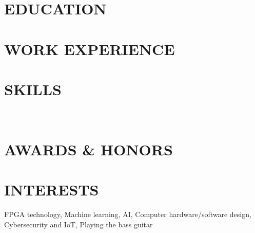 \documentclass[11pt,letterpaper]{article}
\newcommand{\xspace}{0.7\baselineskip}
\begin{document}


\section*{EDUCATION} %
    

\section*{WORK EXPERIENCE}
    
    \vspace{\xspace}
    


\section*{SKILLS}
     \\
    


\section{AWARDS \& HONORS}
    

\section*{INTERESTS}
    FPGA technology, Machine learning, AI, Computer hardware/software design, Cybersecurity and IoT, Playing the bass guitar
\end{document}
